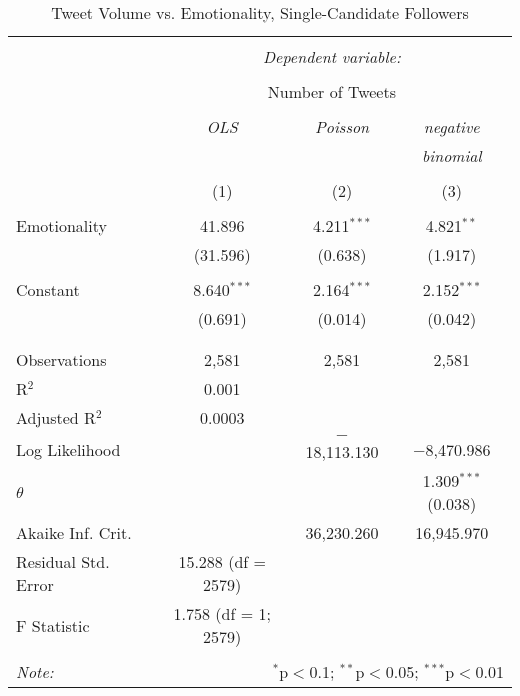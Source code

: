 \begin{table}[!htbp] \centering 
  \caption{Tweet Volume vs. Emotionality, Single-Candidate Followers} 
  \label{} 
    \begin{tabular}{@{\extracolsep{5pt}}lccc} 
    \\[-1.8ex]\hline 
    \hline \\[-1.8ex] 
     & \multicolumn{3}{c}{\textit{Dependent variable:}} \\ 
    \cline{2-4} 
    \\[-1.8ex] & \multicolumn{3}{c}{Number of Tweets} \\ 
    \\[-1.8ex] & \textit{OLS} & \textit{Poisson} & \textit{negative} \\ 
     & \textit{} & \textit{} & \textit{binomial} \\ 
    \\[-1.8ex] & (1) & (2) & (3)\\ 
    \hline \\[-1.8ex] 
     Emotionality & 41.896 & 4.211$^{***}$ & 4.821$^{**}$ \\ 
      & (31.596) & (0.638) & (1.917) \\ 
      & & & \\ 
     Constant & 8.640$^{***}$ & 2.164$^{***}$ & 2.152$^{***}$ \\ 
      & (0.691) & (0.014) & (0.042) \\ 
      & & & \\ 
    \hline \\[-1.8ex] 
    Observations & 2,581 & 2,581 & 2,581 \\ 
    R$^{2}$ & 0.001 &  &  \\ 
    Adjusted R$^{2}$ & 0.0003 &  &  \\ 
    Log Likelihood &  & $-$18,113.130 & $-$8,470.986 \\ 
    $\theta$ &  &  & 1.309$^{***}$  (0.038) \\ 
    Akaike Inf. Crit. &  & 36,230.260 & 16,945.970 \\ 
    Residual Std. Error & 15.288 (df = 2579) &  &  \\ 
    F Statistic & 1.758 (df = 1; 2579) &  &  \\ 
    \hline 
    \hline \\[-1.8ex] 
    \textit{Note:}  & \multicolumn{3}{r}{$^{*}$p$<$0.1; $^{**}$p$<$0.05; $^{***}$p$<$0.01} \\ 
    \end{tabular} 
\end{table}  

